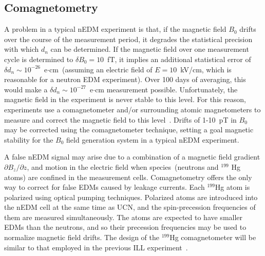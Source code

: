 \subsection{Comagnetometry}
A problem in a typical nEDM experiment is that, if the magnetic field
$B_0$ drifts over the course of the measurement period, it degrades
the statistical precision with which $d_n$ can be determined.  If the
magnetic field over one measurement cycle is determined to
$\delta B_0=10$~fT, it implies an additional statistical error of
$\delta d_n\sim 10^{-26}$~e$\cdot$cm~(assuming an electric field of
$E=10$~kV/cm, which is reasonable for a neutron EDM experiment). Over
100 days of averaging, this would make a
$\delta d_n\sim 10^{-27}$~e$\cdot$cm measurement possible.
Unfortunately, the magnetic field in the experiment is never stable to
this level.  For this reason, experiments use a comagnetometer and/or
surrounding atomic magnetometers to measure and correct the magnetic
field to this
level~\cite{Baker2006,brys2005magnetic,afach2014dynamic}. Drifts of
1-10~pT in $B_0$ may be corrected using the comagnetometer technique,
setting a goal magnetic stability for the $B_0$ field generation
system in a typical nEDM experiment.



A false nEDM signal may arise due to a combination of a magnetic field
gradient $\partial {B_z}/\partial z$, and motion in the electric field
when species~(neutrons and $^{199}$ Hg atoms) are confined in the
measurement cells. Comagnetometry offers the only way to correct for
false EDMs caused by leakage currents.  Each $^{199}$Hg atom is
polarized using optical pumping techniques. Polarized atoms are
introduced into the nEDM cell at the same time as UCN, and the
spin-precession frequencies of them are measured simultaneously. The
atoms are expected to have smaller EDMs than the neutrons, and so
their precession frequencies may be used to normalize magnetic field
drifts.  The design of the $^{199}$Hg comagnetometer will be similar
to that employed in the previous ILL
experiment~\cite{Baker2006,Griffith2009}.




